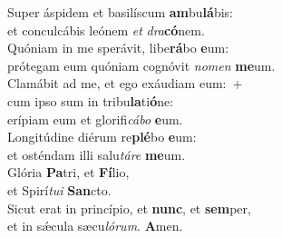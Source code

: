 \oddverse Super áspidem et basilíscum \textbf{am}bu\textbf{lá}bis:~\*\\
\oddverse et conculcábis leónem \textit{et} \textit{dra}\textbf{có}nem.\\
\evenverse Quóniam in me sperávit, libe\textbf{rá}bo \textbf{e}um:~\*\\
\evenverse prótegam eum quóniam cognóvit \textit{no}\textit{men} \textbf{me}um.\\
\oddverse Clamábit ad me, et ego exáudiam eum:~+\\
\oddverse  cum ipso sum in tribu\textbf{la}ti\textbf{ó}ne:~\*\\
\oddverse erípiam eum et glorifi\textit{cá}\textit{bo} \textbf{e}um.\\
\evenverse Longitúdine diérum re\textbf{plé}bo \textbf{e}um:~\*\\
\evenverse et osténdam illi salu\textit{tá}\textit{re} \textbf{me}um.\\
\oddverse Glória \textbf{Pa}tri, et \textbf{Fí}lio,~\*\\
\oddverse et Spirí\textit{tu}\textit{i} \textbf{San}cto.\\
\evenverse Sicut erat in princípio, et \textbf{nunc}, et \textbf{sem}per,~\*\\
\evenverse et in sǽcula sæcu\textit{ló}\textit{rum}. \textbf{A}men.\\
